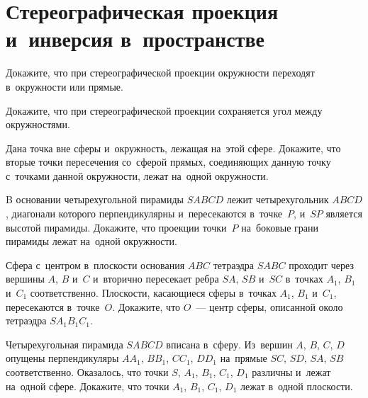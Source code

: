 
\section*{Стереографическая проекция и~инверсия в~пространстве}


\begin{problems}

\item
Докажите, что при стереографической проекции окружности переходят в~окружности
или прямые.

\item
Докажите, что при стереографической проекции сохраняется угол между
окружностями.

\item
Дана точка вне сферы и~окружность, лежащая на~этой сфере.
Докажите, что вторые точки пересечения со~сферой прямых, соединяющих данную
точку с~точками данной окружности, лежат на~одной окружности.

\item
B основании четырехугольной пирамиды $SABCD$ лежит четырехугольник $ABCD$,
диагонали которого перпендикулярны и~пересекаются в~точке~$P$, и~$SP$ является
высотой пирамиды.
Докажите, что проекции точки~$P$ на~боковые грани пирамиды лежат на~одной
окружности.

\item
Сфера с~центром в~плоскости основания $ABC$ тетраэдра $SABC$ проходит через
вершины $A$, $B$ и~$C$ и~вторично пересекает ребра $SA$, $SB$ и~$SC$
в~точках $A_1$, $B_1$ и~$C_1$ соответственно.
Плоскости, касающиеся сферы в~точках $A_1$, $B_1$ и~$C_1$, пересекаются
в~точке~$O$.
Докажите, что $O$~--- центр сферы, описанной около тетраэдра $S A_1 B_1 C_1$.

\item
Четырехугольная пирамида $SABCD$ вписана в~сферу.
Из~вершин $A$, $B$, $C$, $D$ опущены
перпендикуляры $A A_1$, $B B_1$, $C C_1$, $D D_1$
на~прямые $SC$, $SD$, $SA$, $SB$ соответственно.
Оказалось, что точки $S$, $A_1$, $B_1$, $C_1$, $D_1$ различны и~лежат
на~одной сфере.
Докажите, что точки $A_1$, $B_1$, $C_1$, $D_1$ лежат в~одной плоскости.

\end{problems}

